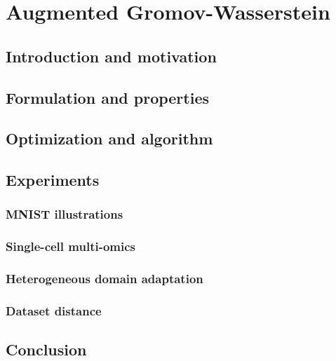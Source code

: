 
\chapter[Augmented Gromov-Wasserstein]{Augmented Gromov-Wasserstein}

\localtableofcontents*


\section{Introduction and motivation}

\section{Formulation and properties}

\section{Optimization and algorithm}

\section{Experiments}

\subsection{MNIST illustrations}

\subsection{Single-cell multi-omics}

\subsection{Heterogeneous domain adaptation}

\subsection{Dataset distance}

\section{Conclusion}
